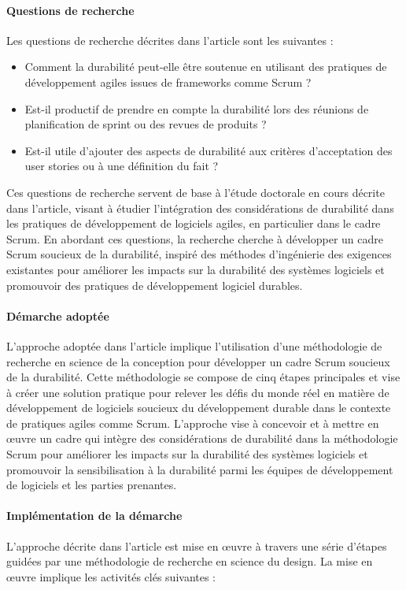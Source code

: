 \paragraph{Questions de recherche}
Les questions de recherche décrites dans l’article sont les suivantes :

\begin{itemize}
    \item Comment la durabilité peut-elle être soutenue en utilisant des pratiques de développement agiles issues de frameworks comme Scrum ?
    \item Est-il productif de prendre en compte la durabilité lors des réunions de planification de sprint ou des revues de produits ?
    \item Est-il utile d'ajouter des aspects de durabilité aux critères d'acceptation des user stories ou à une définition du fait ?
\end{itemize}

Ces questions de recherche servent de base à l'étude doctorale en cours décrite dans l'article, visant à étudier l'intégration des considérations de durabilité dans les pratiques de développement de logiciels agiles, en particulier dans le cadre Scrum. En abordant ces questions, la recherche cherche à développer un cadre Scrum soucieux de la durabilité, inspiré des méthodes d'ingénierie des exigences existantes pour améliorer les impacts sur la durabilité des systèmes logiciels et promouvoir des pratiques de développement logiciel durables.

\paragraph{Démarche adoptée}
L'approche adoptée dans l'article implique l'utilisation d'une méthodologie de recherche en science de la conception pour développer un cadre Scrum soucieux de la durabilité. Cette méthodologie se compose de cinq étapes principales et vise à créer une solution pratique pour relever les défis du monde réel en matière de développement de logiciels soucieux du développement durable dans le contexte de pratiques agiles comme Scrum. L'approche vise à concevoir et à mettre en œuvre un cadre qui intègre des considérations de durabilité dans la méthodologie Scrum pour améliorer les impacts sur la durabilité des systèmes logiciels et promouvoir la sensibilisation à la durabilité parmi les équipes de développement de logiciels et les parties prenantes.

\paragraph{Implémentation de la démarche}
L’approche décrite dans l’article est mise en œuvre à travers une série d’étapes guidées par une méthodologie de recherche en science du design. La mise en œuvre implique les activités clés suivantes :

